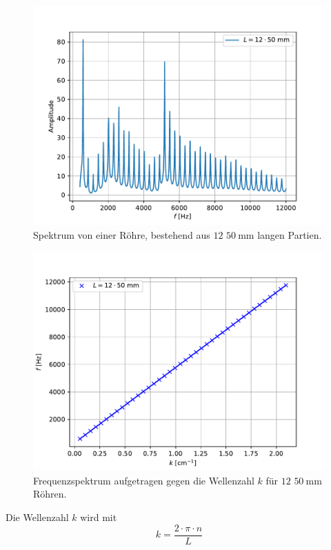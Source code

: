 \begin{figure}
  \centering
  \includegraphics[scale=0.45]{Messwerte/plot4.pdf}
  \caption{Spektrum von einer Röhre, bestehend aus $12$ $\SI{50}{\milli\meter}$ langen Partien.}
  \label{fig:plot4}
\end{figure}
\begin{figure}
  \centering
  \includegraphics[scale=0.45]{Messwerte/plot5.pdf}
  \caption{Frequenzspektrum aufgetragen gegen die Wellenzahl $k$ für $12$ $\SI{50}{\milli\meter}$ Röhren.}
  \label{fig:plot5}
\end{figure}
Die Wellenzahl $k$ wird mit
\begin{equation}
  k=\frac{2\cdot\pi\cdot n}{L}
\end{equation}
